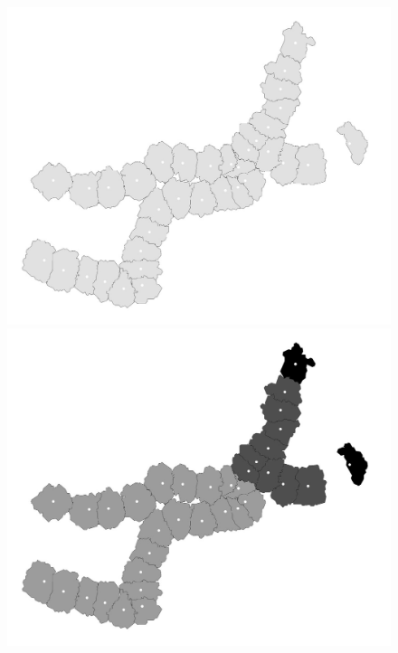 \documentclass[utf8]{article}
\begin{document}
\begin{figure}[htbp]
	\vfill %
	
	\begin{minipage}{0.48\linewidth}
		\centering
		\includegraphics[width=\linewidth]{BusAccessibility}
	\end{minipage}
	\hfill
	\begin{minipage}{0.48\linewidth}
		\centering
		\includegraphics[width=\linewidth]{PopulationJobBalance}
	\end{minipage}


\end{figure}
\end{document}
